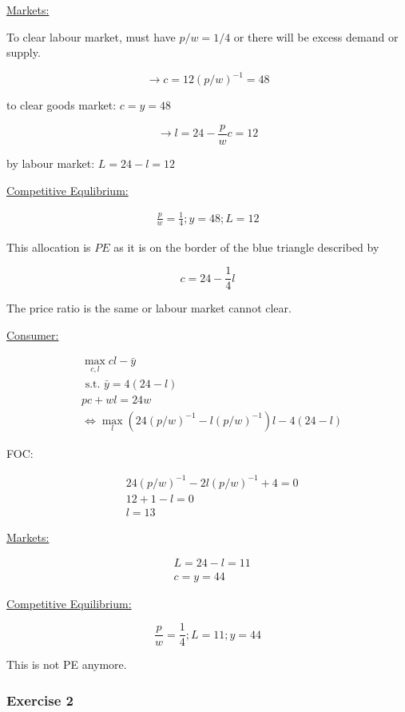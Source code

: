 {{\begin{enumerate}[label=(\alph*)]
{\underline{Markets:}

To clear labour market, must have $p / w=1 / 4$ or there will be excess demand or supply.

$$
\longrightarrow c=12(p / w)^{-1}=48
$$

to clear goods market: $c=y=48$

$$
\longrightarrow l=24-\frac{p}{w} c=12
$$

by labour market: $L=24-l=12$

\underline{Competitive Equlibrium:}

\begin{align*}
    \frac{p}{w}=\frac{1}{4} ; y=48 ; L=12
\end{align*}

This allocation is $P E$ as it is on the border of the blue triangle described by

$$
c=24-\frac{1}{4} l
$$
}
{\item 
The price ratio is the same or labour market cannot clear.

\underline{Consumer:}

$$
\begin{aligned}
& \max _{c, l} c l-\bar{y} \\
& \text { s.t. } \bar{y}=4(24-l) \\
& p c+w l=24 w \\
& \Leftrightarrow \max _{l}\left(24(p / w)^{-1}-l(p / w)^{-1}\right) l-4(24-l)
\end{aligned}
$$

FOC:

$$
\begin{aligned}
& 24(p / w)^{-1}-2 l(p / w)^{-1}+4=0 \\
& 12+1-l=0 \\
& l=13
\end{aligned}
$$

\underline{Markets:}

$$
\begin{aligned}
& L=24-l=11 \\
& c=y=44
\end{aligned}
$$

\underline{Competitive Equilibrium:}

$$
\frac{p}{w}=\frac{1}{4} ; L=11 ; y=44
$$

This is not PE anymore.
}
\end{enumerate}
}
{
\subsubsection*{Exercise 2}

}}
